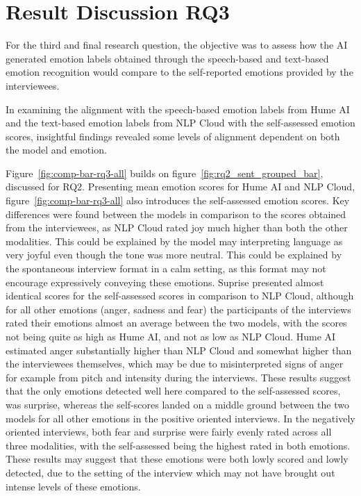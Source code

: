 
\section{Result Discussion RQ3}
For the third and final research question, the objective was to assess how the AI generated emotion labels obtained through the speech-based and text-based emotion recognition would compare to the self-reported emotions provided by the interviewees.

In examining the alignment with the speech-based emotion labels from Hume AI and the text-based emotion labels from NLP Cloud with the self-assessed emotion scores, insightful findings revealed some levels of alignment dependent on both the model and emotion.

Figure~\ref{fig:comp-bar-rq3-all} builds on figure~\ref{fig:rq2_sent_grouped_bar}, discussed for RQ2. Presenting mean emotion scores for Hume AI and NLP Cloud, figure~\ref{fig:comp-bar-rq3-all} also introduces the self-assessed emotion scores.
Key differences were found between the models in comparison to the scores obtained from the interviewees, as NLP Cloud rated joy much higher than both the other modalities. This could be explained by the model may interpreting language as very joyful even though the tone was more neutral. This could be explained by the spontaneous interview format in a calm setting, as this format may not encourage expressively conveying these emotions.
Suprise presented almost identical scores for the self-assessed scores in comparison to NLP Cloud, although for all other emotions (anger, sadness and fear) the participants of the interviews rated their emotions almost an average between the two models, with the scores not being quite as high as Hume AI, and not as low as NLP Cloud. Hume AI estimated anger substantially higher than NLP Cloud and somewhat higher than the interviewees themselves, which may be due to misinterpreted signs of anger for example from pitch and intensity during the interviews. These results suggest that the only emotions detected well here compared to the self-assessed scores, was surprise, whereas the self-scores landed on a middle ground between the two models for all other emotions in the positive oriented interviews.
In the negatively oriented interviews, both fear and surprise were fairly evenly rated across all three modalities, with the self-assessed being the highest rated in both emotions. These results may suggest that these emotions were both lowly scored and lowly detected, due to the setting of the interview which may not have brought out intense levels of these emotions.
